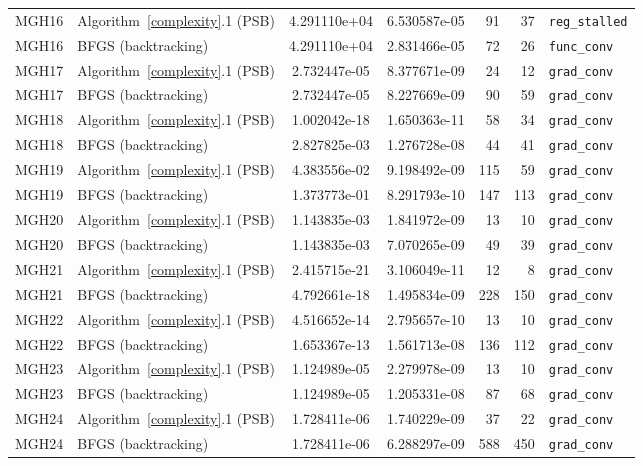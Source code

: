 \documentclass{article}
\begin{document}
{\begin{longtable}{l l S[table-format=1.3e2] S[table-format=1.3e2] r r >{\raggedright\arraybackslash}p{2.2cm}}
		\midrule
		MGH16 & Algorithm~\ref{complexity}.1 (PSB) & 4.291110e+04 & 6.530587e-05 & 91 & 37 & \texttt{reg\_stalled} \\
		MGH16 & BFGS (backtracking) & 4.291110e+04 & 2.831466e-05 & 72 & 26 & \texttt{func\_conv} \\
		\midrule
		MGH17 & Algorithm~\ref{complexity}.1 (PSB) & 2.732447e-05 & 8.377671e-09 & 24 & 12 & \texttt{grad\_conv} \\
		MGH17 & BFGS (backtracking) & 2.732447e-05 & 8.227669e-09 & 90 & 59 & \texttt{grad\_conv} \\
		\midrule
		MGH18 & Algorithm~\ref{complexity}.1 (PSB) & 1.002042e-18 & 1.650363e-11 & 58 & 34 & \texttt{grad\_conv} \\
		MGH18 & BFGS (backtracking) & 2.827825e-03 & 1.276728e-08 & 44 & 41 & \texttt{grad\_conv} \\
		\midrule
		MGH19 & Algorithm~\ref{complexity}.1 (PSB) & 4.383556e-02 & 9.198492e-09 & 115 & 59 & \texttt{grad\_conv} \\
		MGH19 & BFGS (backtracking) & 1.373773e-01 & 8.291793e-10 & 147 & 113 & \texttt{grad\_conv} \\
		\midrule
		MGH20 & Algorithm~\ref{complexity}.1 (PSB) & 1.143835e-03 & 1.841972e-09 & 13 & 10 & \texttt{grad\_conv} \\
		MGH20 & BFGS (backtracking) & 1.143835e-03 & 7.070265e-09 & 49 & 39 & \texttt{grad\_conv} \\
		\midrule
		MGH21 & Algorithm~\ref{complexity}.1 (PSB) & 2.415715e-21 & 3.106049e-11 & 12 & 8 & \texttt{grad\_conv} \\
		MGH21 & BFGS (backtracking) & 4.792661e-18 & 1.495834e-09 & 228 & 150 & \texttt{grad\_conv} \\
		\midrule
		MGH22 & Algorithm~\ref{complexity}.1 (PSB) & 4.516652e-14 & 2.795657e-10 & 13 & 10 & \texttt{grad\_conv} \\
		MGH22 & BFGS (backtracking) & 1.653367e-13 & 1.561713e-08 & 136 & 112 & \texttt{grad\_conv} \\
		\midrule
		MGH23 & Algorithm~\ref{complexity}.1 (PSB) & 1.124989e-05 & 2.279978e-09 & 13 & 10 & \texttt{grad\_conv} \\
		MGH23 & BFGS (backtracking) & 1.124989e-05 & 1.205331e-08 & 87 & 68 & \texttt{grad\_conv} \\
		\midrule
		MGH24 & Algorithm~\ref{complexity}.1 (PSB) & 1.728411e-06 & 1.740229e-09 & 37 & 22 & \texttt{grad\_conv} \\
		MGH24 & BFGS (backtracking) & 1.728411e-06 & 6.288297e-09 & 588 & 450 & \texttt{grad\_conv} \\

\end{longtable}}
\end{document}
